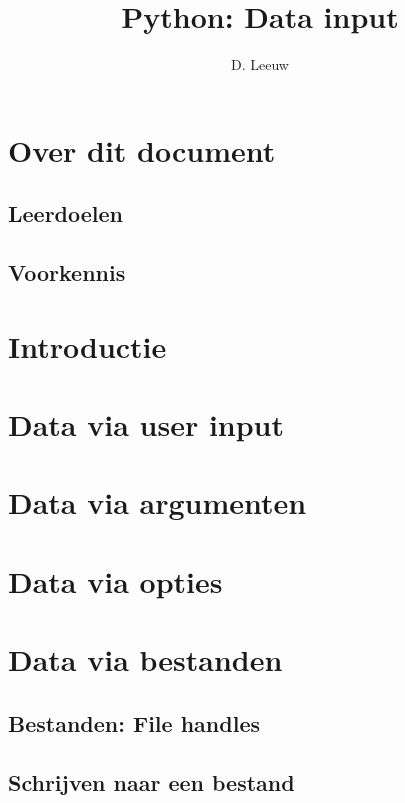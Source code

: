 \documentclass[a4paper,12pt,twoside,titlepage]{article}
\author{D. Leeuw}
\title{Python: Data input}
\date{\today\\
0.0.0
\vfill
\raggedright
\copyright\ 2026 Dennis Leeuw\\
}
\begin{document}

\maketitle



\section{Over dit document}
\subsection{Leerdoelen}

\subsection{Voorkennis}


\section{Introductie}


\section{Data via user input}


\section{Data via argumenten}


\section{Data via opties}


\section{Data via bestanden}
\subsection{Bestanden: File handles}

\subsection{Schrijven naar een bestand}

\end{document}
